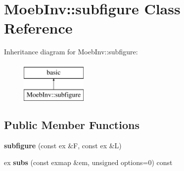 \hypertarget{class_moeb_inv_1_1subfigure}{}\section{Moeb\+Inv\+:\+:subfigure Class Reference}
\label{class_moeb_inv_1_1subfigure}
Inheritance diagram for Moeb\+Inv\+:\+:subfigure\+:\begin{figure}[H]
\begin{center}
\leavevmode
\includegraphics[height=2.000000cm]{class_moeb_inv_1_1subfigure}
\end{center}
\end{figure}
\subsection*{Public Member Functions}
\begin{DoxyCompactItemize}
\item 
\mbox{\label{class_moeb_inv_1_1subfigure_ab64c52c45f0b7a0bed82b13aeb2418b2}} 
{\bfseries subfigure} (const ex \&F, const ex \&L)
\item 
\mbox{\label{class_moeb_inv_1_1subfigure_ac873c29bb1b1a0b70b29cddf71193834}} 
ex {\bfseries subs} (const exmap \&em, unsigned options=0) const
\end{DoxyCompactItemize}
